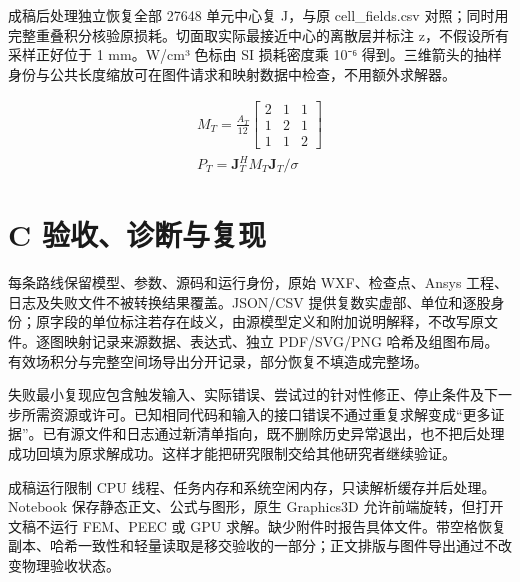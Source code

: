 \documentclass[journal,10pt]{IEEEtran}
\begin{document}
成稿后处理独立恢复全部 27648 单元中心复 J，与原 cell\_fields.csv 对照；同时用完整重叠积分核验原损耗。切面取实际最接近中心的离散层并标注 z，不假设所有采样正好位于 1 mm。W/cm³ 色标由 SI 损耗密度乘 10⁻⁶ 得到。三维箭头的抽样身份与公共长度缩放可在图件请求和映射数据中检查，不用额外求解器。


\hypertarget{E09}{}
\begin{equation}
\begin{gathered}
M_T=\frac{A_T}{12}\begin{bmatrix}2&1&1\\1&2&1\\1&1&2\end{bmatrix} \\
P_T=\mathbf J_T^H M_T\mathbf J_T/\sigma
\end{gathered}
\tag{9}\label{eq:E09}
\end{equation}
\FloatBarrier
\section*{C 验收、诊断与复现}
\hypertarget{chapter-C}{}
每条路线保留模型、参数、源码和运行身份，原始 WXF、检查点、Ansys 工程、日志及失败文件不被转换结果覆盖。JSON/CSV 提供复数实虚部、单位和逐股身份；原字段的单位标注若存在歧义，由源模型定义和附加说明解释，不改写原文件。逐图映射记录来源数据、表达式、独立 PDF/SVG/PNG 哈希及组图布局。有效场积分与完整空间场导出分开记录，部分恢复不填造成完整场。


失败最小复现应包含触发输入、实际错误、尝试过的针对性修正、停止条件及下一步所需资源或许可。已知相同代码和输入的接口错误不通过重复求解变成“更多证据”。已有源文件和日志通过新清单指向，既不删除历史异常退出，也不把后处理成功回填为原求解成功。这样才能把研究限制交给其他研究者继续验证。


成稿运行限制 CPU 线程、任务内存和系统空闲内存，只读解析缓存并后处理。Notebook 保存静态正文、公式与图形，原生 Graphics3D 允许前端旋转，但打开文稿不运行 FEM、PEEC 或 GPU 求解。缺少附件时报告具体文件。带空格恢复副本、哈希一致性和轻量读取是移交验收的一部分；正文排版与图件导出通过不改变物理验收状态。
\end{document}
